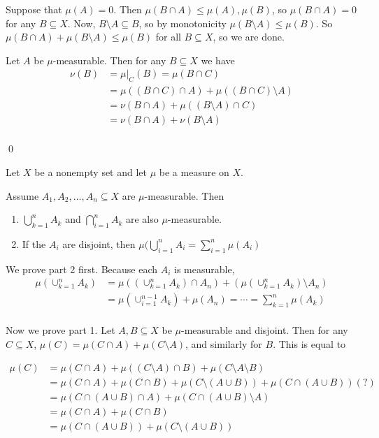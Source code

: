 \documentclass[x11names,reqno,14pt]{extarticle}
\begin{document}
Suppose that $\mu(A) = 0$. Then $\mu(B\cap A) \leq \mu(A), \mu(B)$, so $\mu(B\cap A) = 0$ for any $B\subseteq X$. Now, $B\setminus A \subseteq B$, so by monotonicity $\mu(B\setminus A)\leq\mu(B)$. So $\mu(B \cap A) + \mu(B\setminus A) \leq \mu(B)$ for all $B \subseteq X$, so we are done. 

Let $A$ be $\mu$-measurable. Then for any $B\subseteq X$ we have 
\begin{align*}
\nu(B) & = \mu|_C(B) = \mu(B \cap C) \\
		 & = \mu((B\cap C) \cap A) + \mu((B\cap C)\setminus A) \\
		 & = \nu(B \cap A) + \mu((B\setminus A) \cap C)\\
		 & = \nu(B \cap A) + \nu(B\setminus A) \\
\end{align*}

\qed

\thm

Let $X$ be a nonempty set and let $\mu$ be a measure on $X$. 

Assume $A_1, A_2, \dots, A_n\subseteq X$ are $\mu$-measurable. Then
\begin{enumerate}
\item $\bigcup_{k=1}^n A_k$ and $\bigcap_{i=1}^nA_k$ are also $\mu$-measurable. 
\item If the $A_i$ are disjoint, then $\mu(\bigcup_{i=1}^nA_i = \sum_{i=1}^n\mu(A_i)$
\end{enumerate}

\proof

We prove part 2 first. Because each $A_i$ is measurable, 
\begin{align*}
\mu(\cup_{k=1}^nA_k) & = \mu((\cup_{k=1}^nA_k)\cap A_n) + (\mu(\cup_{k=1}^nA_k) \setminus A_n) \\
& = \mu(\cup_{i=1}^{n - 1}A_k) + \mu(A_n) = \cdots = \sum_{k=1}^n\mu(A_k) \\
\end{align*}

Now we prove part 1. Let $A, B \subseteq X$ be $\mu$-measurable and disjoint. Then for any $C\subseteq X$, $\mu(C) = \mu(C \cap A) + \mu(C\setminus A)$, and similarly for $B$. This is equal to 

\begin{align*}
\mu(C) & = \mu(C \cap A) + \mu((C\setminus A) \cap B) + \mu(C\setminus A \setminus B) \\
		 & = \mu(C\cap A) + \mu(C\cap B) + \mu(C\setminus(A\cup B)) + \mu(C\cap(A\cup B)) (?)\\
		 & = \mu(C \cap (A \cup B) \cap A) + \mu(C \cap (A \cup B) \setminus A) \\
		 & = \mu(C \cap A) + \mu(C\cap B) \\
		 & = \mu(C \cap (A \cup B)) + \mu(C\setminus(A \cup B))
\end{align*}
\end{document}
